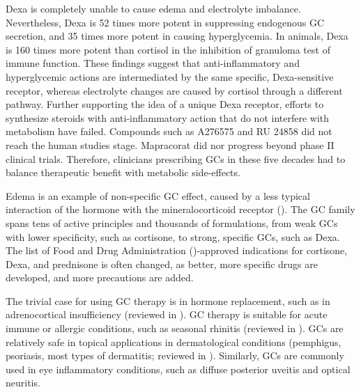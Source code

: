 \documentclass[12pt,english]{report}\usepackage[]{graphicx}\usepackage[]{color}
\begin{document}
Dexa is completely unable to cause edema and electrolyte imbalance.
Nevertheless, Dexa is 52 times more potent in suppressing endogenous
GC secretion, and 35 times more potent in causing hyperglycemia\citep{frawley1959effects,meikle1977potency}.
In animals, Dexa is 160 times more potent than cortisol in the inhibition
of granuloma test of immune function\citep{silber1959biology}. These
findings suggest that anti-inflammatory and hyperglycemic actions
are intermediated by the same specific, Dexa-sensitive receptor, whereas
electrolyte changes are caused by cortisol through a different pathway.
Further supporting the idea of a unique Dexa receptor, efforts to
synthesize steroids with anti-inflammatory action that do not interfere
with metabolism have failed. Compounds such as A276575\citep{lin2002trans-activation}
and RU 24858\citep{belvisi2001therapeutic} did not reach the human
studies stage. Mapracorat\citep{baiula2014mapracorat} did nor progress
beyond phase II clinical trials. Therefore, clinicians prescribing
GCs in these five decades had to balance therapeutic benefit with
metabolic side-effects.

Edema is an example of non-specific GC effect, caused by a less typical
interaction of the hormone with the mineralocorticoid receptor ().
The GC family spans tens of active principles and thousands of formulations,
from weak GCs with lower specificity, such as cortisone, to strong,
specific GCs, such as Dexa. The list of Food and Drug Administration
()-approved indications
for cortisone, Dexa, and prednisone is often changed, as better, more
specific drugs are developed, and more precautions are added\citep{merckco.inc.2004dexamethasone,pharmaciaandupjohnandcompany2007prednisone,west-wardpharmaceuticalcorp.2008hydrocortisone}.

The trivial case for using GC therapy is in hormone replacement, such
as in adrenocortical insufficiency (reviewed in \citep{johannsson2015adrenal}).
GC therapy is suitable for acute immune or allergic conditions, such
as seasonal rhinitis (reviewed in \citep{johannsson2015adrenal}).
GCs are relatively safe in topical applications in dermatological
conditions (pemphigus, psoriasis, most types of dermatitis; reviewed
in \citep{brazzini2002new}). Similarly, GCs are commonly used in
eye inflammatory conditions\citep{christoforidis2012systemic,gordon1950effects},
such as diffuse posterior uveitis and optical neuritis.
\end{document}
